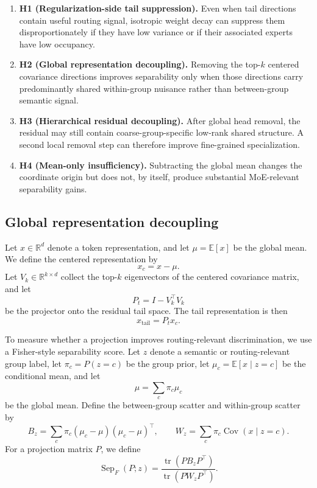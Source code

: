 \documentclass[11pt]{article}
\begin{document}
\begin{enumerate}[leftmargin=1.5em]
    \item \textbf{H1 (Regularization-side tail suppression).} Even when tail directions contain useful routing signal, isotropic weight decay can suppress them disproportionately if they have low variance or if their associated experts have low occupancy.

    \item \textbf{H2 (Global representation decoupling).} Removing the top-$k$ centered covariance directions improves separability only when those directions carry predominantly shared within-group nuisance rather than between-group semantic signal.

    \item \textbf{H3 (Hierarchical residual decoupling).} After global head removal, the residual may still contain coarse-group-specific low-rank shared structure. A second local removal step can therefore improve fine-grained specialization.

    \item \textbf{H4 (Mean-only insufficiency).} Subtracting the global mean changes the coordinate origin but does not, by itself, produce substantial MoE-relevant separability gains.
\end{enumerate}

\subsection{Global representation decoupling}

Let $x \in \mathbb{R}^d$ denote a token representation, and let $\mu = \mathbb{E}[x]$ be the global mean. We define the centered representation by
\[
x_c = x - \mu .
\]
Let $V_k \in \mathbb{R}^{k \times d}$ collect the top-$k$ eigenvectors of the centered covariance matrix, and let
\[
P_t = I - V_k^\top V_k
\]
be the projector onto the residual tail space. The tail representation is then
\[
x_{\mathrm{tail}} = P_t x_c .
\]

To measure whether a projection improves routing-relevant discrimination, we use a Fisher-style separability score. Let $z$ denote a semantic or routing-relevant group label, let $\pi_c = P(z=c)$ be the group prior, let $\mu_c = \mathbb{E}[x \mid z=c]$ be the conditional mean, and let
\[
\mu = \sum_c \pi_c \mu_c
\]
be the global mean. Define the between-group scatter and within-group scatter by
\[
B_z = \sum_c \pi_c (\mu_c - \mu)(\mu_c - \mu)^\top,
\qquad
W_z = \sum_c \pi_c \operatorname{Cov}(x \mid z=c).
\]
For a projection matrix $P$, we define
\[
\operatorname{Sep}_F(P;z)
=
\frac{\operatorname{tr}(P B_z P^\top)}{\operatorname{tr}(P W_z P^\top)}.
\]
\end{document}
